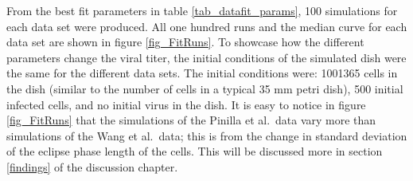 From the best fit parameters in table \ref{tab_datafit_params}, 100 simulations for each data set were produced. All one hundred runs and the median curve for each data set are shown in figure \ref{fig_FitRuns}. To showcase how the different parameters change the viral titer, the initial conditions of the simulated dish were the same for the different data sets. The initial conditions were: 1001365 cells in the dish (similar to the number of cells in a typical 35 mm petri dish), 500 initial infected cells, and no initial virus in the dish. It is easy to notice in figure \ref{fig_FitRuns} that the simulations of the Pinilla et al.\ data vary more than simulations of the Wang et al.\ data; this is from the change in standard deviation of the eclipse phase length of the cells. This will be discussed more in section \ref{findings} of the discussion chapter.

